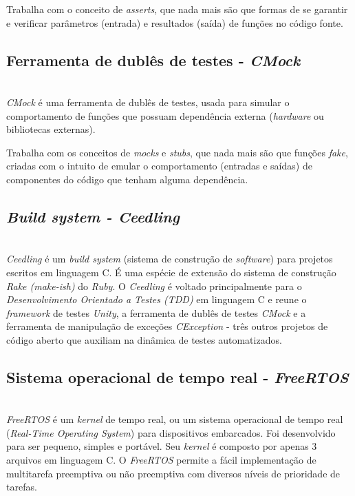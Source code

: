 \documentclass[times, twoside, watermark]{artigo}
\begin{document}
Trabalha com o conceito de \textit{asserts}, que nada mais são que formas de se
garantir e verificar parâmetros (entrada) e resultados (saída) de funções no código
fonte.\cite{unity}


\subsection{Ferramenta de dublês de testes - \textit{CMock}}\hfill\\

\textit{CMock} é uma ferramenta de dublês de testes, usada para simular o
comportamento de funções que possuam dependência externa (\textit{hardware} ou
bibliotecas externas).

Trabalha com os conceitos de \textit{mocks} e \textit{stubs},
que nada mais são que funções \textit{fake}, criadas com o intuito de emular o
comportamento (entradas e saídas) de componentes do código que tenham alguma
dependência.\cite{cmock}

\subsection{\textit{Build system - Ceedling}}\hfill\\

\textit{Ceedling} é um \textit{build system} (sistema de construção de
\textit{software}) para projetos escritos em linguagem C.
É uma espécie de extensão do sistema de construção \textit{Rake (make-ish)} do
\textit{Ruby}.
O \textit{Ceedling} é voltado principalmente para o
\textit{Desenvolvimento Orientado a Testes (TDD)} em linguagem C e reune o
\textit{framework} de testes \textit{Unity}, a ferramenta de dublês de testes
\textit{CMock} e a ferramenta de manipulação de exceções \textit{CException} - três
outros projetos de código aberto que auxiliam na dinâmica de testes
automatizados\cite{gomes2016uttos}.

\subsection{Sistema operacional de tempo real - \textit{FreeRTOS}}\hfill\\

\textit{FreeRTOS} é um \textit{kernel} de tempo real,
ou um sistema operacional de tempo real (\textit{Real-Time Operating System})
para dispositivos embarcados. Foi desenvolvido para ser pequeno, simples e portável.
Seu \textit{kernel} é composto por apenas 3 arquivos em linguagem C.
O \textit{FreeRTOS} permite a fácil implementação de multitarefa preemptiva
ou não preemptiva com diversos níveis de prioridade de
tarefas\cite{zhu2016understanding}.\hfill\\
\end{document}

